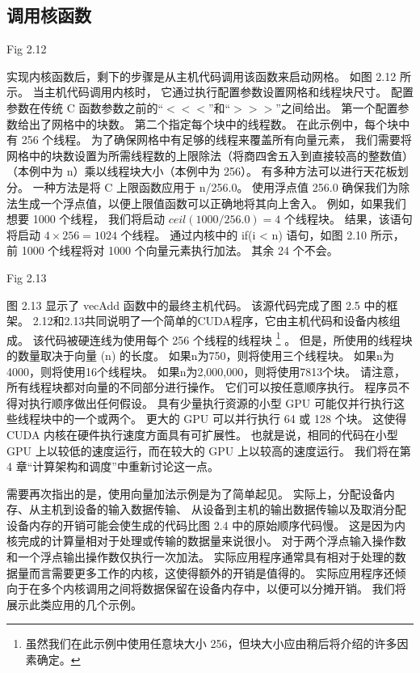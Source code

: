\subsection{调用核函数}
{\color{red} Fig 2.12}

实现内核函数后，剩下的步骤是从主机代码调用该函数来启动网格。 如图 2.12 所示。 当主机代码调用内核时，
它通过执行配置参数设置网格和线程块尺寸。 配置参数在传统 C 函数参数之前的“$<<<$”和“$>>>$”之间给出。 
第一个配置参数给出了网格中的块数。 第二个指定每个块中的线程数。 在此示例中，每个块中有 256 个线程。 
为了确保网格中有足够的线程来覆盖所有向量元素，
我们需要将网格中的块数设置为所需线程数的上限除法（将商四舍五入到直接较高的整数值） 
（本例中为 n）乘以线程块大小（本例中为 256）。 有多种方法可以进行天花板划分。 一种方法是将 C 上限函数应用于 n/256.0。 
使用浮点值 256.0 确保我们为除法生成一个浮点值，以便上限值函数可以正确地将其向上舍入。 例如，如果我们想要 1000 个线程，
我们将启动 $ceil(1000/256.0) = 4$ 个线程块。 结果，该语句将启动 $4 \times 256 = 1024$ 个线程。 
通过内核中的 if(i < n) 语句，如图 2.10 所示，前 1000 个线程将对 1000 个向量元素执行加法。 其余 24 个不会。

{\color{red} Fig 2.13}

图 2.13 显示了 vecAdd 函数中的最终主机代码。 该源代码完成了图 2.5 中的框架。 
2.12和2.13共同说明了一个简单的CUDA程序，它由主机代码和设备内核组成。 该代码被硬连线为使用每个 256 个线程的线程块
\footnote{虽然我们在此示例中使用任意块大小 256，但块大小应由稍后将介绍的许多因素确定。} 。 
但是，所使用的线程块的数量取决于向量 (n) 的长度。 如果n为750，则将使用三个线程块。 如果n为4000，则将使用16个线程块。 
如果n为2,000,000，则将使用7813个块。 请注意，所有线程块都对向量的不同部分进行操作。 
它们可以按任意顺序执行。 程序员不得对执行顺序做出任何假设。 
具有少量执行资源的小型 GPU 可能仅并行执行这些线程块中的一个或两个。 更大的 GPU 可以并行执行 64 或 128 个块。 
这使得 CUDA 内核在硬件执行速度方面具有可扩展性。 
也就是说，相同的代码在小型 GPU 上以较低的速度运行，而在较大的 GPU 上以较高的速度运行。 
我们将在第 4 章“计算架构和调度”中重新讨论这一点。

需要再次指出的是，使用向量加法示例是为了简单起见。 
实际上，分配设备内存、从主机到设备的输入数据传输、
从设备到主机的输出数据传输以及取消分配设备内存的开销可能会使生成的代码比图 2.4 中的原始顺序代码慢。 
这是因为内核完成的计算量相对于处理或传输的数据量来说很小。 对于两个浮点输入操作数和一个浮点输出操作数仅执行一次加法。 
实际应用程序通常具有相对于处理的数据量而言需要更多工作的内核，这使得额外的开销是值得的。 
实际应用程序还倾向于在多个内核调用之间将数据保留在设备内存中，以便可以分摊开销。 我们将展示此类应用的几个示例。

